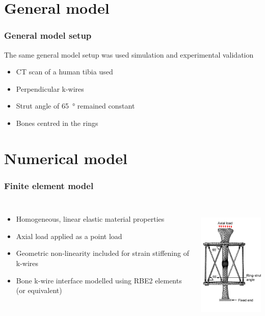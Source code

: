 \documentclass[aspectratio=169,xcolor={svgnames,table},10pt,fleqn]{beamer}
\begin{document}
\section{General model}

  \begin{frame}
    \frametitle{General model setup}
    The same general model setup was used simulation and experimental validation
    \begin{itemize}
      \item CT scan of a human tibia used
      \item Perpendicular k-wires
      \item Strut angle of \qty{65}{\degree} remained constant
      \item Bones centred in the rings
    \end{itemize}
  \end{frame}

\section{Numerical model}

  \begin{frame}
    \frametitle{Finite element model}
    \begin{columns}
      \begin{itemize}
        \item Homogeneous, linear elastic material properties
        \item Axial load applied as a point load
        \item Geometric non-linearity included for strain stiffening of k-wires
        \item Bone k-wire interface modelled using RBE2 elements (or equivalent)
      \end{itemize}
      \centering
      \includegraphics[height=6cm]{Figs/FEM_model_b.png}
    \end{columns}
  \end{frame}
\end{document}
